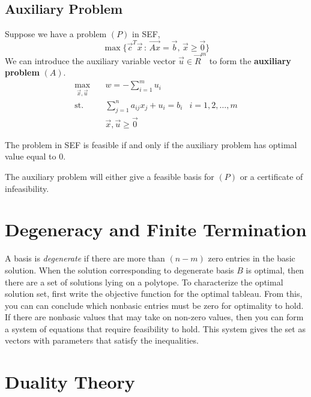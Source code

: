 \subsection{Auxiliary Problem}
Suppose we have a problem $(P)$ in SEF,
\begin{equation}
    \max\{\Vec{c}^T\Vec{x}\,:\, \Vec{Ax}=\Vec{b},\, \Vec{x}\geq\Vec{0}\}
\end{equation}
We can introduce the auxiliary variable vector $\Vec{u}\in\Vec{R}^{m}$ to form the \textbf{auxiliary problem} $(A)$.
\begin{align}
        \max_{\Vec{x},\Vec{u}} \quad & w = -\sum_{i=1}^m u_i & \\
        \text{st.} \quad & \sum_{j=1}^n a_{ij}x_j + u_i = b_i & i=1,2,\dots,m \\
         & \Vec{x},\Vec{u}\geq \Vec{0}
\end{align}

\begin{theorem}
The problem in SEF is feasible if and only if the auxiliary problem has optimal value equal to 0.
\end{theorem}

The auxiliary problem will either give a feasible basis for $(P)$ or a certificate of infeasibility.



\section{Degeneracy and Finite Termination}
A basis is \textit{degenerate} if there are more than $(n-m)$ zero entries in the basic solution. When the solution corresponding to degenerate basis $B$ is optimal, then there are a set of solutions lying on a polytope. To characterize the optimal solution set, first write the objective function for the optimal tableau. From this, you can can conclude which nonbasic entries must be zero for optimality to hold. If there are nonbasic values that may take on non-zero values, then you can form a system of equations that require feasibility to hold. This system gives the set as vectors with parameters that satisfy the inequalities.



\section{Duality Theory}


